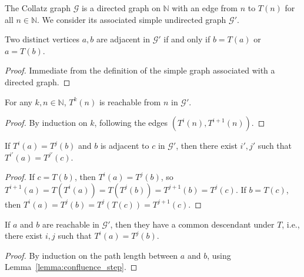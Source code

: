 \begin{definition}\label{def:collatz_graph}\leanok
The Collatz graph $\mathcal{G}$ is a directed graph on $\mathbb{N}$ with an edge from $n$ to $T(n)$ for all $n \in \mathbb{N}$. We consider its associated simple undirected graph $\mathcal{G}'$.
\end{definition}

\begin{lemma}\label{lemma:collatz_graph_adj_iff}\leanok
Two distinct vertices $a, b$ are adjacent in $\mathcal{G}'$ if and only if $b = T(a)$ or $a = T(b)$.
\end{lemma}
\begin{proof}\leanok
Immediate from the definition of the simple graph associated with a directed graph.
\end{proof}

\begin{lemma}\label{lemma:T_iter_reachable}\leanok
For any $k, n \in \mathbb{N}$, $T^k(n)$ is reachable from $n$ in $\mathcal{G}'$.
\end{lemma}
\begin{proof}\leanok
By induction on $k$, following the edges $(T^i(n), T^{i+1}(n))$.
\end{proof}

\begin{lemma}\label{lemma:confluence_step}\leanok
If $T^i(a) = T^j(b)$ and $b$ is adjacent to $c$ in $\mathcal{G}'$, then there exist $i', j'$ such that $T^{i'}(a) = T^{j'}(c)$.
\end{lemma}
\begin{proof}\leanok
If $c = T(b)$, then $T^i(a) = T^j(b)$, so $T^{i+1}(a) = T(T^i(a)) = T(T^j(b)) = T^{j+1}(b) = T^j(c)$.
If $b = T(c)$, then $T^i(a) = T^j(b) = T^j(T(c)) = T^{j+1}(c)$.
\end{proof}

\begin{lemma}\label{lemma:confluence_of_reachable}\leanok
If $a$ and $b$ are reachable in $\mathcal{G}'$, then they have a common descendant under $T$, i.e., there exist $i, j$ such that $T^i(a) = T^j(b)$.
\end{lemma}
\begin{proof}\leanok
By induction on the path length between $a$ and $b$, using Lemma~\ref{lemma:confluence_step}.
\end{proof}

